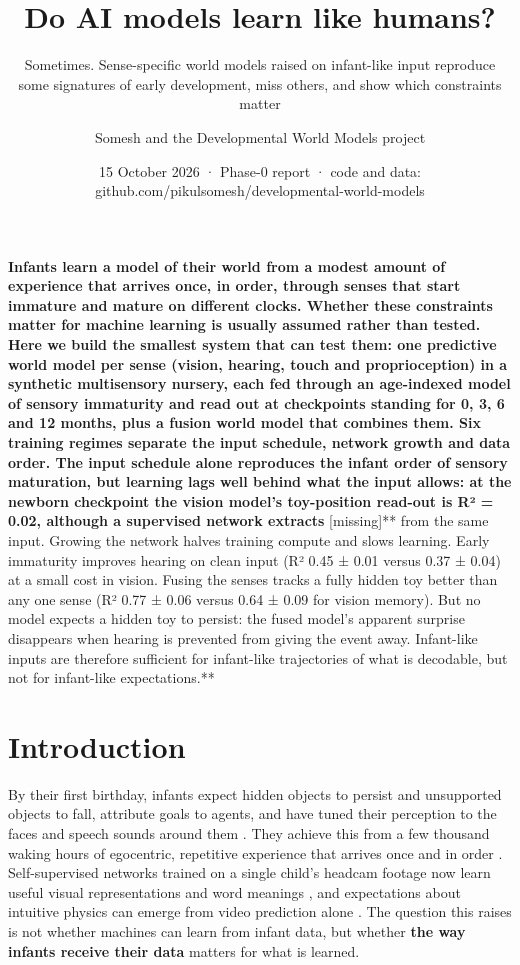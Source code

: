 \documentclass[
]{article}
\title{Do AI models learn like humans?}
\subtitle{Sometimes. Sense-specific world models raised on infant-like
input reproduce some signatures of early development, miss others, and
show which constraints matter}
\author{Somesh and the Developmental World Models project}
\date{15 October 2026 · Phase-0 report · code and data:
github.com/pikulsomesh/developmental-world-models}
\begin{document}
\maketitle

\textbf{Infants learn a model of their world from a modest amount of
experience that arrives once, in order, through senses that start
immature and mature on different clocks. Whether these constraints
matter for machine learning is usually assumed rather than tested. Here
we build the smallest system that can test them: one predictive world
model per sense (vision, hearing, touch and proprioception) in a
synthetic multisensory nursery, each fed through an age-indexed model of
sensory immaturity and read out at checkpoints standing for 0, 3, 6 and
12 months, plus a fusion world model that combines them. Six training
regimes separate the input schedule, network growth and data order. The
input schedule alone reproduces the infant order of sensory maturation,
but learning lags well behind what the input allows: at the newborn
checkpoint the vision model's toy-position read-out is R² = 0.02,
although a supervised network extracts }{[}missing{]}** from the same
input. Growing the network halves training compute and slows learning.
Early immaturity improves hearing on clean input (R² 0.45 ± 0.01 versus
0.37 ± 0.04) at a small cost in vision. Fusing the senses tracks a fully
hidden toy better than any one sense (R² 0.77 ± 0.06 versus 0.64 ± 0.09
for vision memory). But no model expects a hidden toy to persist: the
fused model's apparent surprise disappears when hearing is prevented
from giving the event away. Infant-like inputs are therefore sufficient
for infant-like trajectories of what is decodable, but not for
infant-like expectations.**

\hypertarget{introduction}{%
\section{Introduction}\label{introduction}}

By their first birthday, infants expect hidden objects to persist and
unsupported objects to fall, attribute goals to agents, and have tuned
their perception to the faces and speech sounds around them
\citep{spelke2007core, baillargeon1985object, werker1984cross, pascalis2002species}.
They achieve this from a few thousand waking hours of egocentric,
repetitive experience that arrives once and in order
\citep{smith2018curriculum}. Self-supervised networks trained on a
single child's headcam footage now learn useful visual representations
and word meanings
\citep{orhan2020self, orhan2024learning, vong2024grounded}, and
expectations about intuitive physics can emerge from video prediction
alone \citep{garrido2025intuitive}. The question this raises is not
whether machines can learn from infant data, but whether \textbf{the way
infants receive their data} matters for what is learned.
\end{document}
